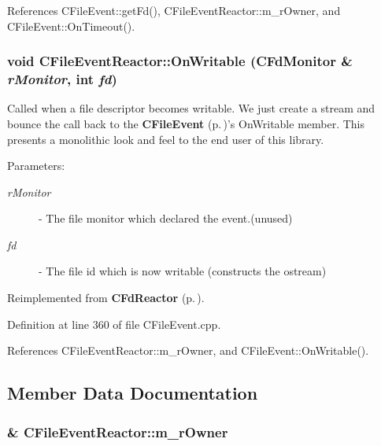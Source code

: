 References CFile\-Event::get\-Fd(), CFile\-Event\-Reactor::m\_\-r\-Owner, and CFile\-Event::On\-Timeout().
\subsubsection{\setlength{\rightskip}{0pt plus 5cm}void CFile\-Event\-Reactor::On\-Writable ({\bf CFd\-Monitor} \& {\em r\-Monitor}, int {\em fd})\hspace{0.3cm}{\tt  [virtual]}}\label{classCFileEvent_1_1CFileEventReactor_a3}


Called when a file descriptor becomes writable. We just create a stream and bounce the call back to the {\bf CFile\-Event} {\rm (p.\,\pageref{classCFileEvent})}'s On\-Writable member. This presents a monolithic look and feel to the end user of this library.\begin{Desc}
\item[Parameters: ]\par
\begin{description}
\item[{\em 
r\-Monitor}]- The file monitor which declared the event.(unused) \item[{\em 
fd}]- The file id which is now writable  (constructs the ostream) \end{description}
\end{Desc}


Reimplemented from {\bf CFd\-Reactor} {\rm (p.\,\pageref{classCFdReactor_a7})}.

Definition at line 360 of file CFile\-Event.cpp.

References CFile\-Event\-Reactor::m\_\-r\-Owner, and CFile\-Event::On\-Writable().

\subsection{Member Data Documentation}
\subsubsection{\& CFile\-Event\-Reactor::m\_\-r\-Owner\hspace{0.3cm}{\tt  [private]}}\label{classCFileEvent_1_1CFileEventReactor_o0}


